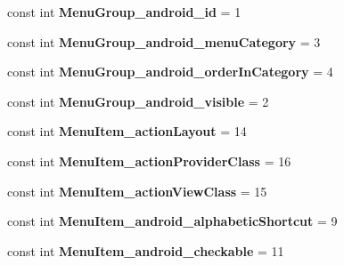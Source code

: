\begin{DoxyCompactItemize}
const int {\bfseries Menu\+Group\+\_\+android\+\_\+id} = 1
\item 
\mbox{\label{class_sample_app_1_1_droid_1_1_resource_1_1_styleable_a7e67abfc5c6bef4883153ec0980d81ab}} 
const int {\bfseries Menu\+Group\+\_\+android\+\_\+menu\+Category} = 3
\item 
\mbox{\label{class_sample_app_1_1_droid_1_1_resource_1_1_styleable_a1fd051c438a5d94158a3b19d5d2fc760}} 
const int {\bfseries Menu\+Group\+\_\+android\+\_\+order\+In\+Category} = 4
\item 
\mbox{\label{class_sample_app_1_1_droid_1_1_resource_1_1_styleable_ad79ea86fcbbaa0b11a67eb8171d79062}} 
const int {\bfseries Menu\+Group\+\_\+android\+\_\+visible} = 2
\item 
\mbox{\label{class_sample_app_1_1_droid_1_1_resource_1_1_styleable_acd9902d7b7a8df98c650f011c26962d0}} 
const int {\bfseries Menu\+Item\+\_\+action\+Layout} = 14
\item 
\mbox{\label{class_sample_app_1_1_droid_1_1_resource_1_1_styleable_a4cf01ae4e338c89f0aefdf745011e6ea}} 
const int {\bfseries Menu\+Item\+\_\+action\+Provider\+Class} = 16
\item 
\mbox{\label{class_sample_app_1_1_droid_1_1_resource_1_1_styleable_adee9a6b6714d970ba5c748936208a8ca}} 
const int {\bfseries Menu\+Item\+\_\+action\+View\+Class} = 15
\item 
\mbox{\label{class_sample_app_1_1_droid_1_1_resource_1_1_styleable_a190ed180838cd5d48106f7f1452d13ae}} 
const int {\bfseries Menu\+Item\+\_\+android\+\_\+alphabetic\+Shortcut} = 9
\item 
\mbox{\label{class_sample_app_1_1_droid_1_1_resource_1_1_styleable_ad22efaca607565d54d7898c1c0c14311}} 
const int {\bfseries Menu\+Item\+\_\+android\+\_\+checkable} = 11

\end{DoxyCompactItemize}
